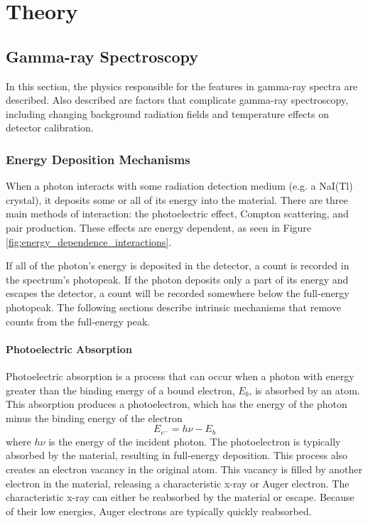 \chapter{Theory}

\section{Gamma-ray Spectroscopy}

In this section, the physics responsible for the features in gamma-ray spectra are described. Also described are factors that complicate gamma-ray spectroscopy, including changing background radiation fields and temperature effects on detector calibration.


\subsection{Energy Deposition Mechanisms}

When a photon interacts with some radiation detection medium (e.g. a NaI(Tl) crystal), it deposits some or all of its energy into the material. There are three main methods of interaction: the photoelectric effect, Compton scattering, and pair production. These effects are energy dependent, as seen in Figure \ref{fig:energy_dependence_interactions}.

If all of the photon's energy is deposited in the detector, a count is recorded in the spectrum's photopeak. If the photon deposits only a part of its energy and escapes the detector, a count will be recorded somewhere below the full-energy photopeak.  The following sections describe intrinsic mechanisms that remove counts from the full-energy peak. %

\subsubsection{Photoelectric Absorption}

Photoelectric absorption is a process that can occur when a photon with energy greater than the binding energy of a bound electron, $E_{b}$, is absorbed by an atom. This absorption produces a photoelectron, which has the energy of the photon minus the binding energy of the electron
%
\begin{equation} \label{eq:photoelectric_effect}
E_{e^{-}} = h\nu - E_{b}
\end{equation}
%
where $h\nu$ is the energy of the incident photon. The photoelectron is typically absorbed by the material, resulting in full-energy deposition. This process also creates an electron vacancy in the original atom. This vacancy is filled by another electron in the material, releasing a characteristic x-ray or Auger electron. The characteristic x-ray can either be reabsorbed by the material or escape. Because of their low energies, Auger electrons are typically quickly reabsorbed.

